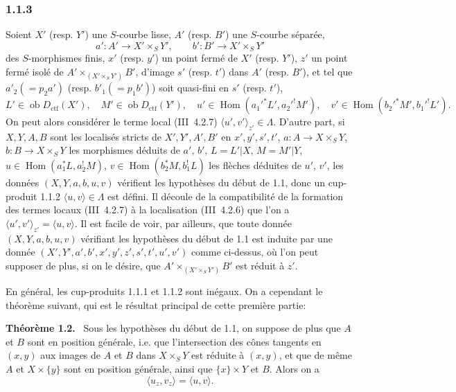 \documentclass[11pt]{article}
\newenvironment{statement}[1]{\par\medskip\noindent\textbf{#1.}\ }{\par\medskip}
\DeclareMathOperator{\Hom}{Hom}
\newcommand{\ob}{\operatorname{ob}}
\providecommand{\ctf}{\mathrm{ctf}}
\begin{document}
\subsubsection*{1.1.3}
Soient $X'$ (resp. $Y'$) une $S$-courbe lisse, $A'$ (resp. $B'$) une $S$-courbe séparée,
\[
a':A'\longrightarrow X'\times_S Y',
\qquad
b':B'\longrightarrow X'\times_S Y'
\]
des $S$-morphismes finis, $x'$ (resp. $y'$) un point fermé de $X'$ (resp. $Y'$), $z'$ un point fermé isolé de $A'\times_{(X'\times_S Y')}B'$, d'image $s'$ (resp. $t'$) dans $A'$ (resp. $B'$), et tel que $a'_2(=p_2a')$ (resp. $b'_1(=p_1b')$) soit quasi-fini en $s'$ (resp. $t'$),
\[
L'\in\ob D_{\ctf}(X'),\quad M'\in\ob D_{\ctf}(Y'),\quad
u'\in\Hom(a_1'^*L',a_2'^!M'),\quad v'\in\Hom(b_2'^*M',b_1'^!L').
\]
On peut alors considérer le terme local (III~4.2.7) $\langle u',v'\rangle_{z'}\in\Lambda$. D'autre part, si $X,Y,A,B$ sont les localisés stricts de $X',Y',A',B'$ en $x',y',s',t'$, $a:A\to X\times_S Y$, $b:B\to X\times_SY$ les morphismes déduits de $a'$, $b'$, $L=L'|X$, $M=M'|Y$, $u\in\Hom(a_1^*L,a_2^!M)$, $v\in\Hom(b_2^*M,b_1^!L)$ les flèches déduites de $u'$, $v'$, les données $(X,Y,a,b,u,v)$ vérifient les hypothèses du début de 1.1, donc un cup-produit 1.1.2 $\langle u,v\rangle\in\Lambda$ est défini. Il découle de la compatibilité de la formation des termes locaux (III~4.2.7) à la localisation (III~4.2.6) que l'on a $\langle u',v'\rangle_{z'}=\langle u,v\rangle$. Il est facile de voir, par ailleurs, que toute donnée $(X,Y,a,b,u,v)$ vérifiant les hypothèses du début de 1.1 est induite par une donnée $(X',Y',a',b',x',y',z',s',t',u',v')$ comme ci-dessus, où l'on peut supposer de plus, si on le désire, que $A'\times_{(X'\times_S Y')}B'$ est réduit à $z'$.

En général, les cup-produits 1.1.1 et 1.1.2 sont inégaux. On a cependant le théorème suivant, qui est le résultat principal de cette première partie:

\begin{statement}{Théorème 1.2}
Sous les hypothèses du début de 1.1, on suppose de plus que $A$ et $B$ sont en position générale, i.e. que l'intersection des cônes tangents en $(x,y)$ aux images de $A$ et $B$ dans $X\times_S Y$ est réduite à $(x,y)$, et que de même $A$ et $X\times\{y\}$ sont en position générale, ainsi que $\{x\}\times Y$ et $B$. Alors on a
\begin{equation}\tag{1.2.1}
\langle u_z,v_z\rangle=\langle u,v\rangle.
\end{equation}
\end{statement}
\end{document}
